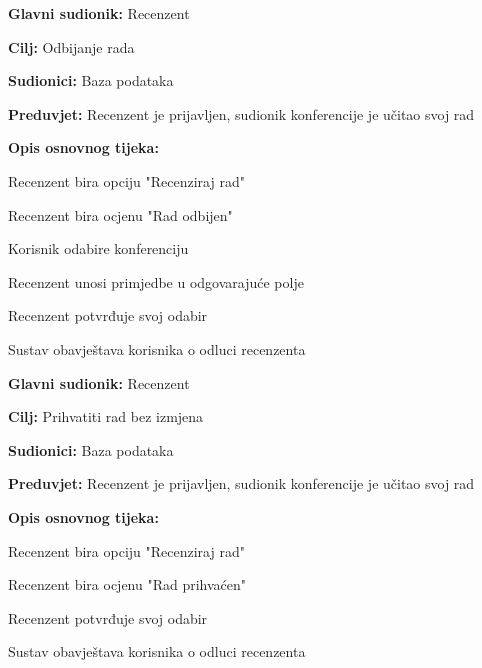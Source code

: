 	\noindent {}
	\begin{packed_item}
		
		\item \textbf{Glavni sudionik: }Recenzent
		\item  \textbf{Cilj:} Odbijanje rada
		\item  \textbf{Sudionici:} Baza podataka
		\item  \textbf{Preduvjet:} Recenzent je prijavljen, sudionik konferencije je učitao svoj rad
		\item  \textbf{Opis osnovnog tijeka:}
		
		\item[] \begin{packed_enum}
			
			\item  Recenzent bira opciju "Recenziraj rad"
			\item Recenzent bira ocjenu "Rad odbijen"
			\item Korisnik odabire konferenciju
			\item Recenzent unosi primjedbe u odgovarajuće polje
			\item Recenzent potvrđuje svoj odabir
			\item Sustav obavještava korisnika o odluci recenzenta
			
		\end{packed_enum}
	\end{packed_item}

	\noindent \underbar{\textbf{UC12 - Prihvati rad}}
	\begin{packed_item}
		
		\item \textbf{Glavni sudionik: }Recenzent
		\item  \textbf{Cilj:} Prihvatiti rad bez izmjena
		\item  \textbf{Sudionici:} Baza podataka
		\item  \textbf{Preduvjet:} Recenzent je prijavljen, sudionik konferencije je učitao svoj rad
		\item  \textbf{Opis osnovnog tijeka:}
		
		\item[] \begin{packed_enum}
			
			\item  Recenzent bira opciju "Recenziraj rad"
			\item Recenzent bira ocjenu "Rad prihvaćen"
			\item Recenzent potvrđuje svoj odabir
			\item Sustav obavještava korisnika o odluci recenzenta
			
		\end{packed_enum}
	\end{packed_item}

